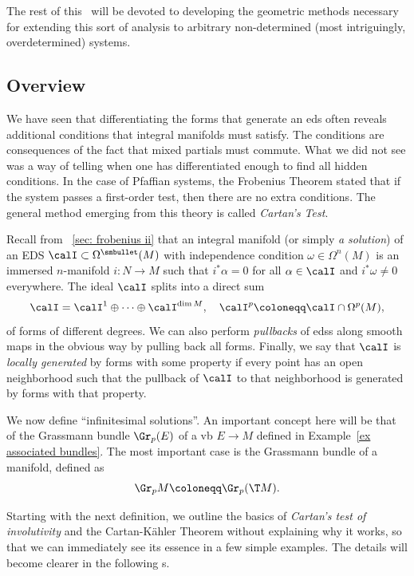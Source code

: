 The rest of this \sect\ will be devoted to developing the geometric methods necessary for extending this sort of analysis to arbitrary non-determined (most intriguingly, overdetermined) systems.














\subsection{Overview}


We have seen that differentiating the forms that generate an \gls{eds} often reveals additional conditions that integral manifolds must satisfy. The conditions are consequences of the fact that mixed partials must commute. What we did not see was a way of telling when one has differentiated enough to find all hidden conditions. In the case of Pfaffian systems, the Frobenius Theorem stated that if the system passes a first-order test, then there are no extra conditions. The general method emerging from this theory is called \emph{Cartan's Test}.

Recall from \subsect~\ref{sec: frobenius ii} that an integral manifold (or simply \emph{a solution}) of an EDS $\calI\subset\Omega^{\smbullet }(M)$ with independence condition $\omega\in\Omega^n(M)$ is an immersed $n$-manifold  $i:N\to M$ such that $i^\ast\alpha=0$ for all $\alpha\in \calI$ and $i^\ast \omega\neq 0$ everywhere. The ideal $\calI$ splits into a direct sum 
\[\calI=\calI^1\oplus\cdots\oplus \calI^{\dim M},\quad \calI^p\coloneqq \calI\cap \Omega^p(M),\]
of forms of different degrees. We can also perform \emph{pullbacks} of \glspl{eds} along smooth maps in the obvious way by pulling back all forms. Finally, we say that $\calI$ is \emph{locally generated} by forms with some property if every point has an open neighborhood such that the pullback of $\calI$ to that neighborhood is generated by forms with that property.

We now define ``infinitesimal solutions''. An important concept here will be that of the Grassmann bundle $\Gr_p(E)$ of a \gls{vb} $E\to M$ defined in Example~\ref{ex associated bundles}. The most important case is the Grassmann bundle of a manifold, defined as
\[\Gr_p M\coloneqq \Gr_p(\T M).\]

Starting with the next definition, we outline the basics of \emph{Cartan's test of involutivity} and the Cartan-K\"ahler Theorem without explaining why it works, so that we can immediately see its essence in a few simple examples. The details will become clearer in the following \subsect s.

